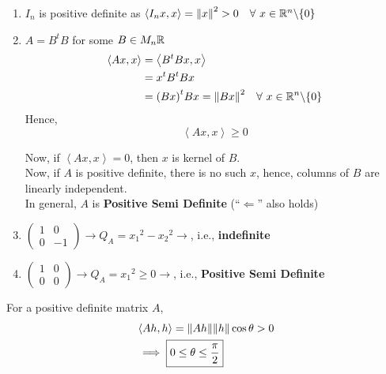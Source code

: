\documentclass[../Analysis-3.tex]{subfiles}
\begin{document}
\begin{Eg}{}{}
  \begin{enumerate}
    \item  $I_n$ is positive definite as $\left\langle I_nx, x \right\rangle = {\|x \|}^2 > 0 \quad \forall\ x \in \mathbb{R}^n \backslash \{0\}$
    \item $A = B^tB$ for some $B \in M_n{\mathbb{R}}$
          \begin{align*}
            \left\langle Ax,x \right\rangle
             & = \left\langle B^tBx,x \right\rangle                                    \\
             & = x^tB^tBx                                                              \\
             & = {(Bx)}^t Bx = {\| Bx \|}^2 \quad \forall\ x \in \mathbb{R}^n \backslash \{0\}
          \end{align*}
          Hence, \[ \left\langle Ax,x \right\rangle \geq 0 \]

          Now, if $ \left\langle Ax,x \right\rangle = 0 $, then  $x$ is kernel of $B$. \\
          Now, if $A$ is positive definite, there is no such $x$, hence, columns of $B$ are linearly independent. \\
          In general, $A$ is \textbf{Positive Semi Definite} (``$\Longleftarrow$'' also holds)

    \item $\begin{pmatrix}
              1 & 0  \\
              0 & -1
            \end{pmatrix} \longrightarrow Q_A = {x_1}^2 - {x_2}^2 \longrightarrow $, i.e., \textbf{indefinite}
    \item  $\begin{pmatrix}
              1 & 0 \\
              0 & 0
            \end{pmatrix} \longrightarrow Q_A = {x_1}^2 \geq 0 \longrightarrow $, i.e., \textbf{Positive Semi Definite}

  \end{enumerate}
\end{Eg}

For a positive definite matrix $ A $,
\begin{align*}
   & \left\langle Ah, h \right\rangle = \norm{Ah}\norm{h}\cos{\theta} > 0 \\
   & \implies \boxed{0 \leq \theta \leq \frac{\pi}{2}}
\end{align*}
\end{document}
